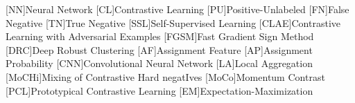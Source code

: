 \begin{acronym}

    [NN]{Neural Network}
    [CL]{Contrastive Learning}
    [PU]{Positive-Unlabeled}
    [FN]{False Negative}
    [TN]{True Negative}
    [SSL]{Self-Supervised Learning}
    [CLAE]{Contrastive Learning with Adversarial Examples}
    [FGSM]{Fast Gradient Sign Method}
    [DRC]{Deep Robust Clustering}
    [AF]{Assignment Feature}
    [AP]{Assignment Probability}
    [CNN]{Convolutional Neural Network}
    [LA]{Local Aggregation}
    [MoCHi]{Mixing of Contrastive Hard negatIves}
    [MoCo]{Momentum Contrast}
    [PCL]{Prototypical Contrastive Learning}
    [EM]{Expectation-Maximization}


\end{acronym}